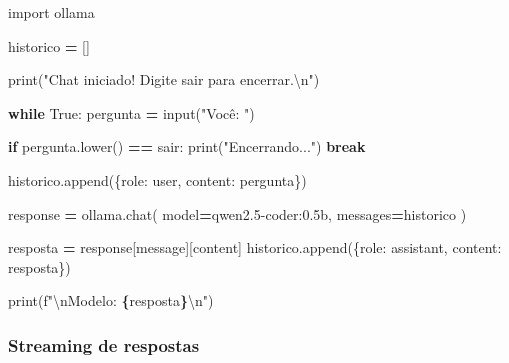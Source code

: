 \documentclass[
]{article}
\newenvironment{Shaded}{\begin{snugshade}}{\end{snugshade}}
\newcommand{\BuiltInTok}[1]{#1}
\newcommand{\CharTok}[1]{\textcolor[rgb]{0.31,0.60,0.02}{#1}}
\newcommand{\ControlFlowTok}[1]{\textcolor[rgb]{0.13,0.29,0.53}{\textbf{#1}}}
\newcommand{\ImportTok}[1]{#1}
\newcommand{\NormalTok}[1]{#1}
\newcommand{\OperatorTok}[1]{\textcolor[rgb]{0.81,0.36,0.00}{\textbf{#1}}}
\newcommand{\SpecialCharTok}[1]{\textcolor[rgb]{0.81,0.36,0.00}{\textbf{#1}}}
\newcommand{\SpecialStringTok}[1]{\textcolor[rgb]{0.31,0.60,0.02}{#1}}
\newcommand{\StringTok}[1]{\textcolor[rgb]{0.31,0.60,0.02}{#1}}
\newcommand{\VariableTok}[1]{\textcolor[rgb]{0.00,0.00,0.00}{#1}}
\begin{document}
\begin{Shaded}
\begin{Highlighting}[]
\ImportTok{import}\NormalTok{ ollama}

\NormalTok{historico }\OperatorTok{=}\NormalTok{ []}

\BuiltInTok{print}\NormalTok{(}\StringTok{"Chat iniciado! Digite \textquotesingle{}sair\textquotesingle{} para encerrar.}\CharTok{\textbackslash{}n}\StringTok{"}\NormalTok{)}

\ControlFlowTok{while} \VariableTok{True}\NormalTok{:}
\NormalTok{    pergunta }\OperatorTok{=} \BuiltInTok{input}\NormalTok{(}\StringTok{"Você: "}\NormalTok{)}

    \ControlFlowTok{if}\NormalTok{ pergunta.lower() }\OperatorTok{==} \StringTok{\textquotesingle{}sair\textquotesingle{}}\NormalTok{:}
        \BuiltInTok{print}\NormalTok{(}\StringTok{"Encerrando..."}\NormalTok{)}
        \ControlFlowTok{break}

\NormalTok{    historico.append(\{}\StringTok{\textquotesingle{}role\textquotesingle{}}\NormalTok{: }\StringTok{\textquotesingle{}user\textquotesingle{}}\NormalTok{, }\StringTok{\textquotesingle{}content\textquotesingle{}}\NormalTok{: pergunta\})}

\NormalTok{    response }\OperatorTok{=}\NormalTok{ ollama.chat(}
\NormalTok{        model}\OperatorTok{=}\StringTok{\textquotesingle{}qwen2.5{-}coder:0.5b\textquotesingle{}}\NormalTok{,}
\NormalTok{        messages}\OperatorTok{=}\NormalTok{historico}
\NormalTok{    )}

\NormalTok{    resposta }\OperatorTok{=}\NormalTok{ response[}\StringTok{\textquotesingle{}message\textquotesingle{}}\NormalTok{][}\StringTok{\textquotesingle{}content\textquotesingle{}}\NormalTok{]}
\NormalTok{    historico.append(\{}\StringTok{\textquotesingle{}role\textquotesingle{}}\NormalTok{: }\StringTok{\textquotesingle{}assistant\textquotesingle{}}\NormalTok{, }\StringTok{\textquotesingle{}content\textquotesingle{}}\NormalTok{: resposta\})}

    \BuiltInTok{print}\NormalTok{(}\SpecialStringTok{f"}\CharTok{\textbackslash{}n}\SpecialStringTok{Modelo: }\SpecialCharTok{\{}\NormalTok{resposta}\SpecialCharTok{\}}\CharTok{\textbackslash{}n}\SpecialStringTok{"}\NormalTok{)}
\end{Highlighting}
\end{Shaded}

\subsubsection{Streaming de respostas}\label{streaming-de-respostas}
\end{document}
